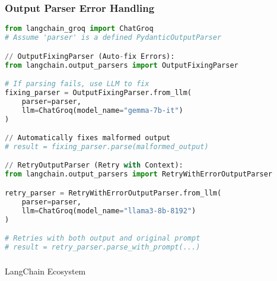 \begin{frame}[fragile]\frametitle{Output Parser Error Handling}

\begin{lstlisting}[language=python, basicstyle=\tiny]
from langchain_groq import ChatGroq
# Assume 'parser' is a defined PydanticOutputParser

// OutputFixingParser (Auto-fix Errors):
from langchain.output_parsers import OutputFixingParser

# If parsing fails, use LLM to fix
fixing_parser = OutputFixingParser.from_llm(
    parser=parser,
    llm=ChatGroq(model_name="gemma-7b-it")
)

// Automatically fixes malformed output
# result = fixing_parser.parse(malformed_output)

// RetryOutputParser (Retry with Context):
from langchain.output_parsers import RetryWithErrorOutputParser

retry_parser = RetryWithErrorOutputParser.from_llm(
    parser=parser,
    llm=ChatGroq(model_name="llama3-8b-8192")
)

# Retries with both output and original prompt
# result = retry_parser.parse_with_prompt(...)
\end{lstlisting}

\end{frame}

\begin{frame}[fragile]\frametitle{}
\begin{center}
{\Large LangChain Ecosystem}
\end{center}
\end{frame}


